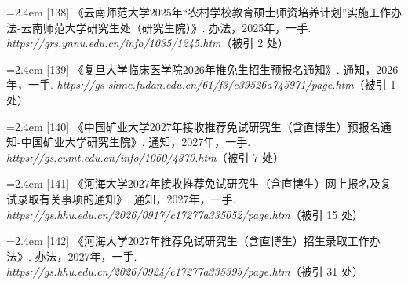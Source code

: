 {\vspace{0.6pt}
\vspace{3.5pt}\par
\nopagebreak\vspace{1pt}
\noindent\hangindent=2.4em \label{src:S0171}{\color{cAccent}[138]} 《云南师范大学2025年“农村学校教育硕士师资培养计划”实施工作办法-云南师范大学研究生处（研究生院）》. 办法，2025年，一手. \textit{https://grs.ynnu.edu.cn/info/1035/1245.htm}（被引 2 处）\par
\vspace{0.6pt}
\vspace{3.5pt}\par
\nopagebreak\vspace{1pt}
\noindent\hangindent=2.4em \label{src:S0172}{\color{cAccent}[139]} 《复旦大学临床医学院2026年推免生招生预报名通知》. 通知，2026年，一手. \textit{https://gs-shmc.fudan.edu.cn/61/f3/c39526a745971/page.htm}（被引 1 处）\par
\vspace{0.6pt}
\vspace{3.5pt}\par
\nopagebreak\vspace{1pt}
\noindent\hangindent=2.4em \label{src:S0173}{\color{cAccent}[140]} 《中国矿业大学2027年接收推荐免试研究生（含直博生）预报名通知-中国矿业大学研究生院》. 通知，2027年，一手. \textit{https://gs.cumt.edu.cn/info/1060/4370.htm}（被引 7 处）\par
\vspace{0.6pt}
\vspace{3.5pt}\par
\nopagebreak\vspace{1pt}
\noindent\hangindent=2.4em \label{src:S0176}{\color{cAccent}[141]} 《河海大学2027年接收推荐免试研究生（含直博生）网上报名及复试录取有关事项的通知》. 通知，2027年，一手. \textit{https://gs.hhu.edu.cn/2026/0917/c17277a335052/page.htm}（被引 15 处）\par
\vspace{0.6pt}
\noindent\hangindent=2.4em \label{src:S0178}{\color{cAccent}[142]} 《河海大学2027年推荐免试研究生（含直博生）招生录取工作办法》. 办法，2027年，一手. \textit{https://gs.hhu.edu.cn/2026/0924/c17277a335395/page.htm}（被引 31 处）\par
\vspace{0.6pt}
}
